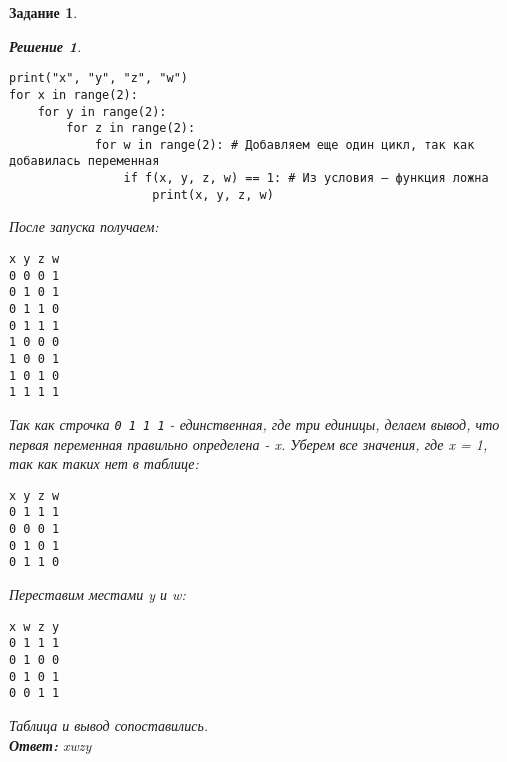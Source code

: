 \documentclass[12pt]{article}
\theoremstyle{problem_style}
\newtheorem{problem}{Задание}[subsection]
\newtheorem{solution}{Решение}[subsection]
\begin{document}
\begin{problem}
\begin{solution}
\begin{verbatim}
print("x", "y", "z", "w")
for x in range(2): 
    for y in range(2):
        for z in range(2): 
            for w in range(2): # Добавляем еще один цикл, так как добавилась переменная
                if f(x, y, z, w) == 1: # Из условия — функция ложна
                    print(x, y, z, w)
\end{verbatim}
После запуска получаем:
\begin{verbatim}
x y z w
0 0 0 1
0 1 0 1
0 1 1 0
0 1 1 1
1 0 0 0
1 0 0 1
1 0 1 0
1 1 1 1
\end{verbatim}
Так как строчка \texttt{0 1 1 1} - единственная, где три единицы, делаем вывод, что первая переменная правильно определена - x. Уберем все значения, где x = 1, так как таких нет в таблице:
\begin{verbatim}
x y z w
0 1 1 1
0 0 0 1
0 1 0 1
0 1 1 0
\end{verbatim}
Переставим местами y и w:
\begin{verbatim}
x w z y
0 1 1 1
0 1 0 0
0 1 0 1
0 0 1 1
\end{verbatim}
Таблица и вывод сопоставились.\\
\textbf{Ответ:} xwzy
\end{solution}
\end{problem}
\end{document}
